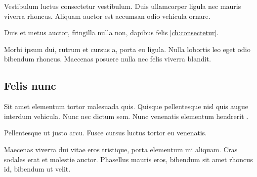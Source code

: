 Vestibulum luctus consectetur vestibulum. Duis ullamcorper ligula nec mauris
viverra rhoncus. Aliquam auctor est accumsan odio vehicula ornare.

\begin{lowlight}
Duis et metus auctor, fringilla nulla non, dapibus felis \ref{ch:consectetur}.
\end{lowlight}

Morbi ipsum dui, rutrum et cursus a, porta eu ligula. Nulla lobortis leo eget
odio bibendum rhoncus. Maecenas posuere nulla nec felis viverra blandit.

\subsection{Felis nunc}

Sit amet elementum tortor malesuada quis. Quisque pellentesque nisl quis augue
interdum vehicula. Nunc nec dictum sem. Nunc venenatis elementum hendrerit \cite[pp. 96--128]{DONECEGET}.

\begin{example}
Pellentesque ut justo arcu. Fusce cursus luctus tortor eu venenatis.
\end{example}

Maecenas viverra dui vitae eros tristique, porta elementum mi aliquam. Cras
sodales erat et molestie auctor. Phasellus mauris eros, bibendum sit amet
rhoncus id, bibendum ut velit.

